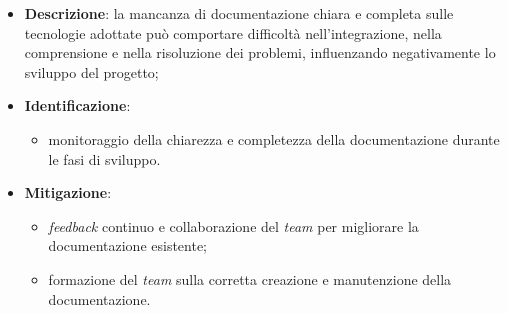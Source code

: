 \label{risk:scarsa documentazione delle tecnologie utilizzate}
\begin{itemize}
	\item \textbf{Descrizione}: la mancanza di documentazione chiara e completa sulle tecnologie adottate 
								può comportare difficoltà nell'integrazione, nella comprensione e nella 
								risoluzione dei problemi, influenzando negativamente lo sviluppo del progetto;
	\item \textbf{Identificazione}:
	      \begin{itemize}
				\item monitoraggio della chiarezza e completezza della documentazione durante le fasi di sviluppo.
	      \end{itemize}

	\item \textbf{Mitigazione}:
	      \begin{itemize}
		      \item \textit{feedback} continuo e collaborazione del \textit{team} per migliorare la documentazione esistente;
			  
			  \item formazione del \textit{team} sulla corretta creazione e manutenzione della documentazione.
	      \end{itemize}
\end{itemize}
